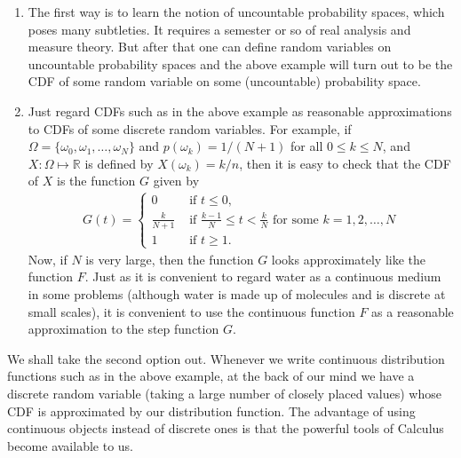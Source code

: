 \documentclass[preprint,  11pt]{amsart}
\theoremstyle{plain} %
\theoremstyle{definition} %
\begin{document}
\begin{enumerate}\setlength\itemsep{6pt}
\item The first way is to learn the notion of uncountable probability spaces, which poses many subtleties. It requires a semester or so of real analysis and measure theory. But after that one can define random variables on uncountable probability spaces and the above example will turn out to be the CDF of some random variable on some (uncountable) probability space.
\item Just regard CDFs such as in the above example as reasonable approximations to CDFs of some discrete random variables. For example, if $\Omega=\{\omega_{0},\omega_{1},\ldots ,\omega_{N}\}$ and $p(\omega_{k})=1/(N+1)$ for all $0\le k\le N$, and $X:\Omega\mapsto \mathbb{R}$ is defined by $X(\omega_{k})=k/n$, then it is easy to check that the CDF of $X$ is the function $G$ given by
\[\begin{aligned}
G(t)=\begin{cases} 0 & \mbox{ if } t\le 0, \\ \frac{k}{N+1} &\mbox{ if }\frac{k-1}{N}\le t<\frac{k}{N}\mbox{ for some }k=1,2,\ldots ,N \\ 1 &\mbox{ if }t\ge 1. \end{cases}
\end{aligned}\]
Now, if $N$ is very large, then the function $G$ looks approximately like the function $F$. Just as it is convenient to regard water as a continuous medium in some problems (although water is made up of molecules and is discrete at small scales), it is convenient to use the continuous function $F$ as a reasonable approximation to the step function $G$. 
\end{enumerate}
We shall take the second option out. Whenever we write continuous distribution functions such as in the above example, at the back of our mind we have a discrete random variable (taking a large number of closely placed values) whose CDF is approximated by our distribution function. The advantage of using continuous objects instead of discrete ones is that the powerful tools of Calculus become available to us.
\end{document}
